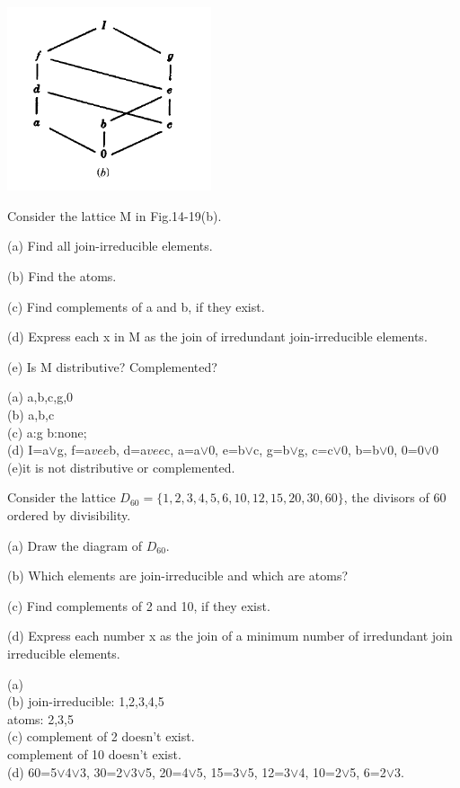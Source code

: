 \documentclass[11pt, a4paper, UTF8]{ctexart}
\begin{document}
\begin{problem}[SM: 14.66]
\par
\begin{center}
    \includegraphics[width=6cm]{tupian1.png}
\end{center}
Consider the lattice M in Fig.14-19(b).

(a) Find all join-irreducible elements.

(b) Find the atoms.

(c) Find complements of a and b, if they exist.

(d) Express each x in M as the join of irredundant join-irreducible elements.

(e) Is M distributive? Complemented?
\end{problem}
\begin{solution}
(a) a,b,c,g,0\\
(b) a,b,c\\
(c) a:g   b:none;\\
(d) I=a$\vee$g, f=a$vee$b, d=a$vee$c, a=a$\vee$0, e=b$\vee$c, g=b$\vee$g, c=c$\vee$0, b=b$\vee$0, 0=0$\vee$0\\
(e)it is not distributive or complemented.
\end{solution}



\begin{problem}[SM: 14.70]
Consider the lattice \(D_{60} = \{1, 2, 3, 4, 5, 6, 10, 12, 15, 20, 30, 60\}\), the divisors of 60 ordered by divisibility.

(a) Draw the diagram of \(D_{60}\).

(b) Which elements are join-irreducible and which are atoms?

(c) Find complements of 2 and 10, if they exist.

(d) Express each number x as the join of a minimum number of irredundant join irreducible elements.
\end{problem}
\begin{solution}
(a) \\
(b) join-irreducible: 1,2,3,4,5\\
atoms: 2,3,5\\
(c) complement of 2 doesn't exist.\\
complement of 10 doesn't exist.\\
(d) 60=5$\vee$4$\vee$3, 30=2$\vee$3$\vee$5, 20=4$\vee$5, 15=3$\vee$5, 12=3$\vee$4, 10=2$\vee$5, 6=2$\vee$3.

\end{solution}
\end{document}
